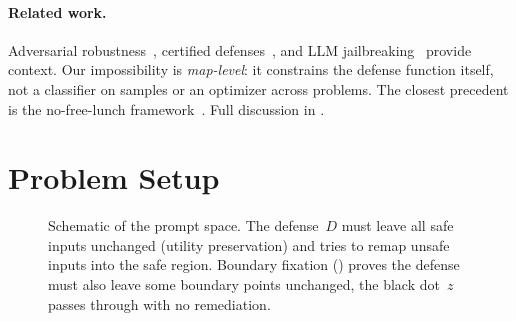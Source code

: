 \documentclass[11pt]{article}
\begin{document}
\paragraph{Related work.}
Adversarial robustness~\cite{szegedy2013intriguing,goodfellow2014explaining,carlini2017evaluating,madry2018towards,tsipras2018robustness},
certified defenses~\cite{cohen2019certified,katz2017reluplex,singh2019abstract},
and LLM jailbreaking~\cite{zou2023universal,chao2024jailbreaking,mehrotra2024tree,greshake2023indirect,mouret2015illuminating,samvelyan2024rainbow}
provide context. Our impossibility is \emph{map-level}: it constrains the defense function itself, not a classifier on samples or an optimizer across problems. The closest precedent is the no-free-lunch framework~\cite{wolpert1997no}. Full discussion in .

\section{Problem Setup}
\label{sec:setup}

\begin{figure}[t]
\centering
{}
\caption{Schematic of the prompt space. The defense~$D$ must leave all
safe inputs unchanged (utility preservation) and tries to remap unsafe
inputs into the safe region. Boundary fixation () proves
the defense must also leave some boundary points unchanged, the black
dot~$z$ passes through with no remediation.}
\label{fig:landscape}
\end{figure}
\end{document}
